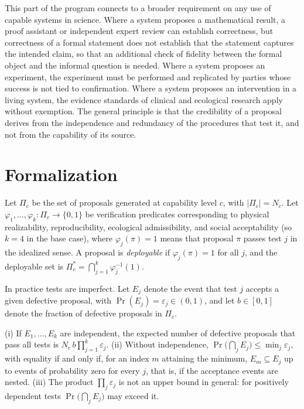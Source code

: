 This part of the program connects to a broader requirement on any use of capable systems in science. Where a system proposes a mathematical result, a proof assistant or independent expert review can establish correctness, but correctness of a formal statement does not establish that the statement captures the intended claim, so that an additional check of fidelity between the formal object and the informal question is needed. Where a system proposes an experiment, the experiment must be performed and replicated by parties whose success is not tied to confirmation. Where a system proposes an intervention in a living system, the evidence standards of clinical and ecological research apply without exemption. The general principle is that the credibility of a proposal derives from the independence and redundancy of the procedures that test it, and not from the capability of its source.

\section*{Formalization}

Let $\Pi_c$ be the set of proposals generated at capability level $c$, with $|\Pi_c|=N_c$. Let $\varphi_1,\dots,\varphi_k:\Pi_c\to\{0,1\}$ be verification predicates corresponding to physical realizability, reproducibility, ecological admissibility, and social acceptability (so $k=4$ in the base case), where $\varphi_j(\pi)=1$ means that proposal $\pi$ passes test $j$ in the idealized sense. A proposal is \emph{deployable} if $\varphi_j(\pi)=1$ for all $j$, and the deployable set is $\Pi_c^\ast=\bigcap_{j=1}^k\varphi_j^{-1}(1)$.

In practice tests are imperfect. Let $E_j$ denote the event that test $j$ accepts a given defective proposal, with $\Pr(E_j)=\varepsilon_j\in(0,1)$, and let $b\in[0,1]$ denote the fraction of defective proposals in $\Pi_c$.

\begin{proposition}
(i) If $E_1,\dots,E_k$ are independent, the expected number of defective proposals that pass all tests is $N_c\,b\prod_{j=1}^k\varepsilon_j$. (ii) Without independence, $\Pr\big(\bigcap_jE_j\big)\le\min_j\varepsilon_j$, with equality if and only if, for an index $m$ attaining the minimum, $E_m\subseteq E_j$ up to events of probability zero for every $j$, that is, if the acceptance events are nested. (iii) The product $\prod_j\varepsilon_j$ is not an upper bound in general: for positively dependent tests $\Pr\big(\bigcap_jE_j\big)$ may exceed it.
\end{proposition}

